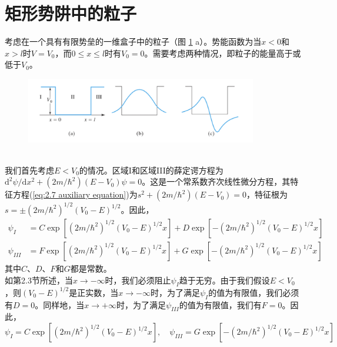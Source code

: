 \section{矩形势阱中的粒子}
\label{sec:2.4 Particle in a Rectangular Potential Well}
	考虑在一个具有有限势垒的一维盒子中的粒子（图 \ref{fig:2.5} a）。势能函数为当$x<0$和$x>l$时$V=V_0$，而$0 \le x \le l$时有$V_0=0$。需要考虑两种情况，即粒子的能量高于或低于$V_0$。
	\begin{figure}[h!]
		\centering
		\includegraphics[width=0.9\textwidth]{Figures/2.5.png}  %
		\caption{}
		\label{fig:2.5}
	\end{figure}
	\\
	\indent 我们首先考虑$E < V_0$的情况。区域I和区域III的薛定谔方程为$\mathrm{d}^2\psi/\mathrm{d}x^2+\left(2m/\hbar^2\right)\left(E-V_0\right)\psi=0$。这是一个常系数齐次线性微分方程，其特征方程(\ref{eq:2.7 auxiliary equation})为$s^2+\left(2m/\hbar^2\right)\left(E-V_0\right)=0$，特征根为$s = \pm \left(2m/\hbar^2\right)^{1/2}\left(V_0-E\right)^{1/2}$。因此，
	\begin{equation*}
		\begin{aligned}
			\psi_I & = C \exp \left[\left(2m/\hbar^2\right)^{1/2}\left(V_0-E\right)^{1/2}x\right] + D \exp \left[-\left(2m/\hbar^2\right)^{1/2}\left(V_0-E\right)^{1/2}x\right] \\
			\psi_{III} & = F \exp \left[\left(2m/\hbar^2\right)^{1/2}\left(V_0-E\right)^{1/2}x\right] + G \exp \left[-\left(2m/\hbar^2\right)^{1/2}\left(V_0-E\right)^{1/2}x\right] 
		\end{aligned}
	\end{equation*}
	其中$C$、$D$、$F$和$G$都是常数。\\
	\indent 如第2.3节所述，当$x \to -\infty$时，我们必须阻止$\psi_I$趋于无穷。由于我们假设$E<V_0$，则$\left(V_0-E\right)^{1/2}$是正实数，当$x \to -\infty$时，为了满足$\psi_I$的值为有限值，我们必须有$D=0$。同样地，当$x \to +\infty$时，为了满足$\psi_{III}$的值为有限值，我们有$F=0$。因此，
	\begin{equation*}
		\psi_I  = C \exp \left[\left(2m/\hbar^2\right)^{1/2}\left(V_0-E\right)^{1/2}x\right] , \quad \psi_{III}  = G \exp \left[-\left(2m/\hbar^2\right)^{1/2}\left(V_0-E\right)^{1/2}x\right]
	\end{equation*}
